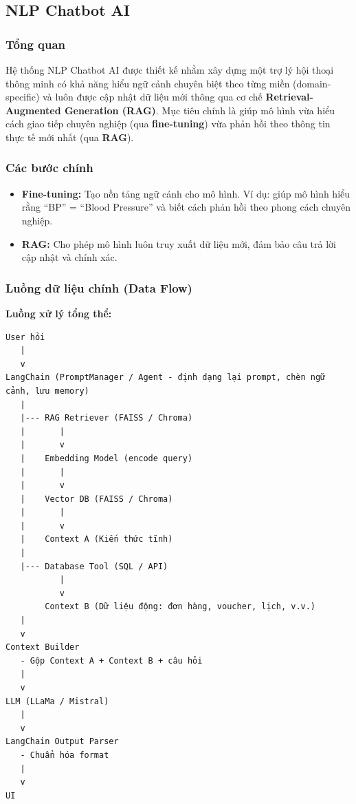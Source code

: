 \subsection{NLP Chatbot AI}

\subsubsection{Tổng quan}
Hệ thống NLP Chatbot AI được thiết kế nhằm xây dựng một trợ lý hội thoại thông minh có khả năng hiểu ngữ cảnh chuyên biệt theo từng miền (domain-specific) và luôn được cập nhật dữ liệu mới thông qua cơ chế \textbf{Retrieval-Augmented Generation (RAG)}.  
Mục tiêu chính là giúp mô hình vừa hiểu cách giao tiếp chuyên nghiệp (qua \textbf{fine-tuning}) vừa phản hồi theo thông tin thực tế mới nhất (qua \textbf{RAG}).

\subsubsection{Các bước chính}
\begin{itemize}
    \item \textbf{Fine-tuning:} Tạo nền tảng ngữ cảnh cho mô hình. Ví dụ: giúp mô hình hiểu rằng “BP” = “Blood Pressure” và biết cách phản hồi theo phong cách chuyên nghiệp.
    \item \textbf{RAG:} Cho phép mô hình luôn truy xuất dữ liệu mới, đảm bảo câu trả lời cập nhật và chính xác.
\end{itemize}

\subsubsection{Luồng dữ liệu chính (Data Flow)}

\noindent
\textbf{Luồng xử lý tổng thể:}

\begin{verbatim}
User hỏi
   |
   v
LangChain (PromptManager / Agent - định dạng lại prompt, chèn ngữ cảnh, lưu memory)
   |
   |--- RAG Retriever (FAISS / Chroma)
   |       |
   |       v
   |    Embedding Model (encode query)
   |       |
   |       v
   |    Vector DB (FAISS / Chroma)
   |       |
   |       v
   |    Context A (Kiến thức tĩnh)
   |
   |--- Database Tool (SQL / API)
           |
           v
        Context B (Dữ liệu động: đơn hàng, voucher, lịch, v.v.)
   |
   v
Context Builder
   - Gộp Context A + Context B + câu hỏi
   |
   v
LLM (LLaMa / Mistral)
   |
   v
LangChain Output Parser
   - Chuẩn hóa format
   |
   v
UI
\end{verbatim}
